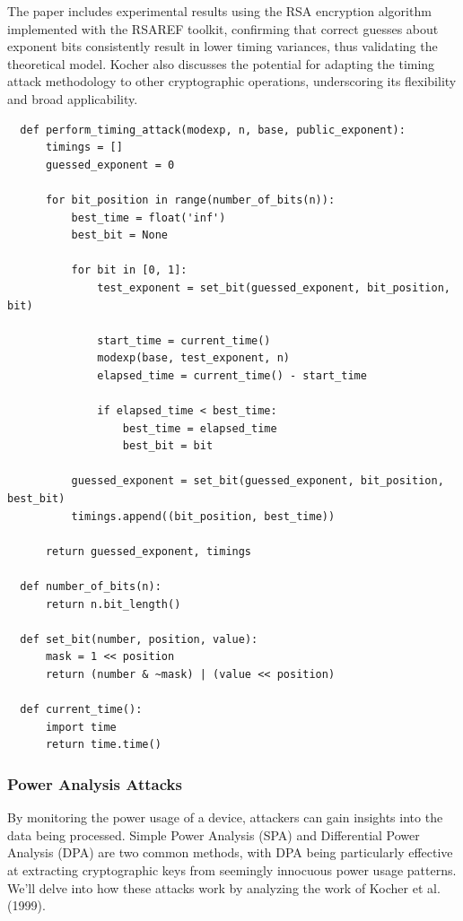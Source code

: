 The paper includes experimental results using the RSA encryption algorithm implemented with the RSAREF toolkit, confirming that correct guesses about exponent bits consistently result in lower timing variances, thus validating the theoretical model. Kocher also discusses the potential for adapting the timing attack methodology to other cryptographic operations, underscoring its flexibility and broad applicability.\\

\begin{verbatim}
  def perform_timing_attack(modexp, n, base, public_exponent):
      timings = []
      guessed_exponent = 0
  
      for bit_position in range(number_of_bits(n)):
          best_time = float('inf')
          best_bit = None
  
          for bit in [0, 1]:
              test_exponent = set_bit(guessed_exponent, bit_position, bit)
  
              start_time = current_time()
              modexp(base, test_exponent, n)
              elapsed_time = current_time() - start_time

              if elapsed_time < best_time:
                  best_time = elapsed_time
                  best_bit = bit
  
          guessed_exponent = set_bit(guessed_exponent, bit_position, best_bit)
          timings.append((bit_position, best_time))
  
      return guessed_exponent, timings
  
  def number_of_bits(n):
      return n.bit_length()
  
  def set_bit(number, position, value):
      mask = 1 << position
      return (number & ~mask) | (value << position)
  
  def current_time():
      import time
      return time.time()
\end{verbatim}

\subsubsection{Power Analysis Attacks}

By monitoring the power usage of a device, attackers can gain insights into the data being processed. Simple Power Analysis (SPA) and Differential Power Analysis (DPA) are two common methods, with DPA being particularly effective at extracting cryptographic keys from seemingly innocuous power usage patterns.
We'll delve into how these attacks work by analyzing the work of Kocher et al. (1999)\cite{kocherDifferentialPowerAnalysis1999}.

